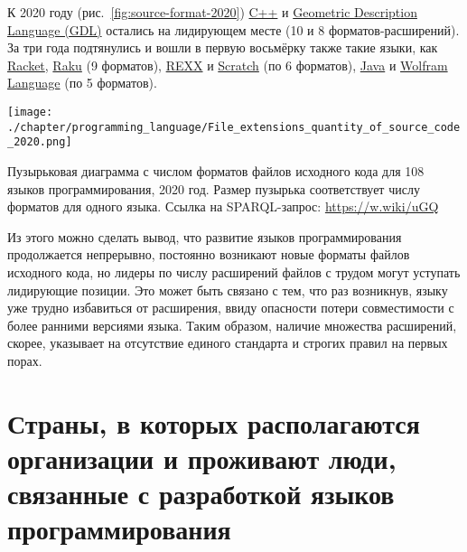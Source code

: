 К 2020 году (рис.~\ref{fig:source-format-2020}) \href{https://en.wikipedia.org/wiki/C++}{C++} и \href{https://en.wikipedia.org/wiki/Geometric_Description_Language}{Geometric Description Language (GDL)} остались на лидирующем месте (10 и 8 форматов-расширений). За три года подтянулись и вошли в первую восьмёрку также такие языки, как \href{https://ru.wikipedia.org/wiki/Racket_(язык_программирования)}{Racket}, \href{https://en.wikipedia.org/wiki/Raku_(programming_language)}{Raku} (9 форматов), \href{https://en.wikipedia.org/wiki/Rexx}{REXX} и \href{https://en.wikipedia.org/wiki/Scratch_(programming_language)}{Scratch} (по 6 форматов), \href{https://ru.wikipedia.org/wiki/Java}{Java} и \href{https://en.wikipedia.org/wiki/Wolfram_Language}{Wolfram Language} (по 5 форматов).

\begin{marginfigure}[2\baselineskip]
\centering
	\texttt{[image: ./chapter/programming\_language/File\_extensions\_quantity\_of\_source\_code\_2020.png]}
	\label{fig:source-format-2020}
	\caption[Пузырьковая диаграмма с числом форматов файлов исходного кода для 108 языков программирования, 2020 год.]{Пузырьковая диаграмма с числом форматов файлов исходного кода для 108 языков программирования, 2020 год. Размер пузырька соответствует числу форматов для одного языка. Ссылка на SPARQL-запрос: \href{https://w.wiki/uGQ}{https://w.wiki/uGQ}}
\end{marginfigure}

Из этого можно сделать вывод, что развитие языков программирования продолжается непрерывно, постоянно возникают новые форматы файлов исходного кода, но лидеры по числу расширений файлов с трудом могут уступать лидирующие позиции. Это может быть связано с тем, что раз возникнув, языку уже трудно избавиться от расширения, 
ввиду опасности потери совместимости с более ранними версиями языка. 
Таким образом, наличие множества расширений, скорее, указывает на отсутствие единого стандарта и строгих правил на первых порах.








\section{Страны, в которых располагаются организации и проживают люди, связанные с разработкой языков программирования}

